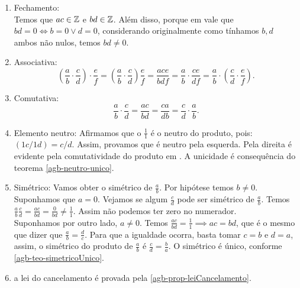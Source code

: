 \documentclass[../main.tex]{subfiles}
\begin{document}
\begin{dem}
    \begin{enumerate}[label=(\roman*)]
        \item Fechamento: \\
        Temos que $ac \in \mathbb{Z}$ e $bd \in \mathbb{Z}$. Além disso, porque em \Z vale que $bd = 0 \iff b = 0 \lor d = 0$, considerando originalmente como tínhamos $b,d$ ambos não nulos, temos $bd \neq 0$.
        
        \item Associativa: \\
            \[
            \left( \frac{a}{b} \cdot \frac{c}{d}\right) \cdot \frac{e}{f} = 
            \left(\frac{a}{b} \cdot \frac{c}{d}\right) \frac{e}{f} = 
            \frac{ace}{bdf} = \frac{a}{b} \cdot \frac{ce}{df} = 
            \frac{a}{b} \cdot \left(\frac{c}{d} \cdot \frac{e}{f}\right)
            .
            \]
            
            
        
        \item Comutativa: \\
        \[ \frac{a}{b} \cdot \frac{c}{d} = 
            \frac{ac}{bd} = 
            \frac{ca}{db} = 
            \frac{c}{d} \cdot \frac{a}{b} . \]
            
        
        \item Elemento neutro: Afirmamos que o $\frac{1}{1}$ é o neutro do produto, pois: $\left(1c/1d \right) = c/d$.
        Assim, provamos que é neutro pela esquerda. Pela direita é evidente pela comutatividade do produto em \Z. A unicidade é consequência do teorema \cref{agb-neutro-unico}.
        
        \item Simétrico: Vamos obter o simétrico de $\frac{a}{b}$. Por hipótese temos $b \neq 0$. Suponhamos que $a=0$. Vejamos se algum $\frac{c}{d}$
        pode ser simétrico de $\frac{a}{b}$. Temos $\frac{a}{b} \frac{c}{d} = \frac{ac}{bd} = \frac{0}{bd} \neq \frac{1}{1}$. Assim não podemos ter zero no numerador. \\
        Suponhamos por outro lado, $a \neq 0$. Temos $\frac{ac}{bd} = \frac{1}{1} \implies ac = bd$, que é o mesmo que dizer que $\frac{a}{b} = \frac{d}{c}$. Para que a igualdade ocorra, basta tomar $c=b$ e $d=a$, assim, o simétrico do produto de $\frac{a}{b}$ é $\frac{c}{d} = \frac{b}{a}$. O simétrico é único, conforme \cref{agb-teo-simetricoUnico}.
        
        \item a lei do cancelamento é provada pela \cref{agb-prop-leiCancelamento}.

    \end{enumerate}    
\end{dem}
\end{document}
